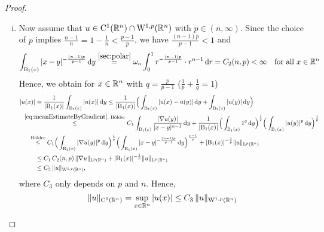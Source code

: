 \begin{proof}
\begin{enumerate}[i)]
    \item Now assume that $u \in \mathrm{C}^1(\mathbb{R}^n) \cap \mathrm{W}^{1,p}(\mathbb{R}^n)$ with $p \in (n,\infty)$.
      Since the choice of $p$ implies $\frac{n - 1}{n} = 1 - \frac{1}{n} < \frac{p -1}{p}$, we have $ \frac{(n - 1)p}{p - 1} < 1$ and
      $$
      \int_{\mathrm{B}_1(x)} |x - y|^{-\frac{(n - 1)p}{p - 1}} \, {\operatorname{d}\!{y}}
      \overset{\ref{sec:polar}}{=} \omega_n \int_0^1 r^{-\frac{(n - 1)p}{p - 1}} \cdot r^{n - 1}\, {\operatorname{d}\!{r}} = C_2(n,p) < \infty \quad\text{for all } x \in \mathbb{R}^n
      $$
      Hence, we obtain for $x \in \mathbb{R}^n$ with $q = \frac{p}{p - 1}$ ($\frac{1}{p} + \frac{1}{q} = 1$)
      \begin{align*}
        |u(x)|
        &= \frac{1}{|\BB_1(x)|} \int_{\BB_1(x)} |u(x)|\d y 
        \leq \frac{1}{|\BB_1(x)|} \Big( \int_{\BB_1(x)} |u(x) - u(y)| \d y + \int_{\BB_1(x)} |u(y)| \d y \Big)\\
        &\hspace{-2em}\overset{\eqref{eq:meanEstimateByGradient},\text{ Hölder}}{\leq} C_1 \int_{\BB_1(x)} \frac{|\nabla u(y)|}{|x - y|^{n - 1}} \d y + \frac{1}{|\BB_1(x)|} \Big( \int_{\BB_1(x)} 1^q \d y \Big)^{\frac{1}{q}} \Big( \int_{\BB_1(x)} |u(y)|^p \d y \Big)^{\frac{1}{p}} \\
        &\hspace{-1em}\overset{\text{Hölder}}{\leq} C_1 \Big( \int_{\BB_1(x)} |\nabla u(y)|^p \d y \Big)^{\frac{1}{p}} \Big( \int_{\BB_1(x)} |x - y|^{-\frac{(n -1)p}{p - 1}} \d y \Big)^{\frac{p - 1}{p}} + |\BB_1(x)|^{-\frac{1}{p}} \|u\|_{\Ell^p(\R^n)} \\
        &\leq C_1\, C_2(n,p) \, \|\nabla u\|_{\Ell^p(\R^n)} + |\BB_1(x)|^{-\frac{1}{p}} \|u\|_{\Ell^p(\R^n)} \\
        &\leq C_3 \, \|u\|_{\WW^{1,p}(\R^n)},
      \end{align*}
      where $C_3$ only depends on $p$ and $n$.
      Hence,
      \begin{equation}
        \label{eq:supEstimate}
        \|u\|_{\mathrm{C}^0(\mathbb{R}^n)} = \sup_{x \in \mathbb{R}^n} |u(x)| \leq C_3\, \|u\|_{\mathrm{W}^{1,p}(\mathbb{R}^n)}
      \end{equation}


\end{enumerate}
\end{proof}
